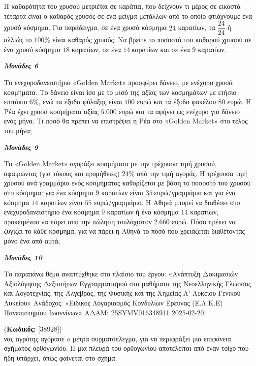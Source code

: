 \documentclass[11pt,a4paper,twoside]{book}
\newcounter{askhsh}[chapter]
\renewcommand{\theaskhsh}{
	\bf{\titlefont{\Large{\thechapter}}.\arabic{askhsh}}
}
\newcommand{\Askhsh}[2]{\refstepcounter{askhsh}{\titlefont{Άσκηση\theaskhsh} - \textcolor{maincolor}{ΘΕΜΑ #2}} (\small{\textbf{Κωδικός:} #1})\\}{}
\newcommand{\monades}[1]{
\hspace*{\fill}
\textbf{\textit{\textcolor{maincolor}{Μονάδες #1}}}}
\begin{document}
\begin{alist}
\item Η καθαρότητα του χρυσού μετριέται σε καράτια, που δείχνουν τι μέρος σε εικοστά τέταρτα είναι ο καθαρός χρυσός σε ένα μείγμα μετάλλων από το οποίο φτιάχνουμε ένα χρυσό κόσμημα. Για παράδειγμα, σε ένα χρυσό κόσμημα $24$ καρατίων, τα $\dfrac{24}{24}$ ή αλλιώς το $100\%$ είναι καθαρός χρυσός. Να βρείτε το ποσοστό του καθαρού χρυσού σε ένα χρυσό κόσμημα $18$ καρατίων, σε ένα $14\ $καρατίων και σε ένα $9$ καρατίων.
\monades{6}
\item Το ενεχυροδανειστήριο «Golden Market» προσφέρει δάνειο, με ενέχυρο χρυσά κοσμήματα. Το δάνειο είναι ίσο με το μισό της αξίας των κοσμημάτων με ετήσιο επιτόκιο $6\%$, ενώ τα έξοδα φύλαξης είναι $100$ ευρώ και τα έξοδα φακέλου $80$ ευρώ. Η Ρέα έχει χρυσά κοσμήματα αξίας $5.000$ ευρώ και τα αφήνει ως ενέχυρο για δάνειο ενός μήνα. Τι ποσό θα πρέπει να επιστρέψει η Ρέα στο «Golden Market» στο τέλος του μήνα;
\monades{9}
\item Το «Golden Market» αγοράζει κοσμήματα με την τρέχουσα τιμή χρυσού, αφαιρώντας (για τόκους και προμήθειες) $24\%$ από την τιμή αγοράς. Η τρέχουσα τιμή χρυσού ανά γραμμάριο ενός κοσμήματος καθορίζεται με βάση το ποσοστό του χρυσού στο κόσμημα: για ένα κόσμημα $9$ καρατίων είναι $35\ $ευρώ/γραμμάριο και για ένα κόσμημα $14$ καρατίων είναι $55$ ευρώ/γραμμάριο. Η Αθηνά μπορεί να διαθέσει στο ενεχυροδανειστήριο ένα κόσμημα $9$ καρατίων ή ένα κόσμημα $14$ καρατίων, προκειμένου να πάρει από την πώληση τουλάχιστον $2.660$ ευρώ. Πόσο πρέπει να ζυγίζει το κάθε κόσμημα, για να πάρει η Αθηνά το ποσό που χρειάζεται διαθέτοντας μόνο ένα από αυτά;
\monades{10}

{\footnotesize Το παραπάνω θέμα αναπτύχθηκε στο πλαίσιο του έργου: «Ανάπτυξη Δοκιμασιών Αξιολόγησης Δεξιοτήτων Εγγραμματισμού στα μαθήματα της Νεοελληνικής Γλώσσας και Λογοτεχνίας, της Άλγεβρας, της Φυσικής και της Χημείας Α' Λυκείου Γενικού Λυκείου» Ανάδοχος: «Ειδικός Λογαριασμός Κονδυλίων Έρευνας (Ε.Λ.Κ.Ε) Πανεπιστημίου Ιωαννίνων» ΑΔΑΜ: 25SYMV016348911 2025-02-20.}
\end{alist}

\vspace{4mm}

\Askhsh{[38928]}
Ένας αγρότης αγόρασε $a$ μέτρα συρματόπλεγμα, για να περιφράξει μια επιφάνεια σχήματος ορθογωνίου. Η μία πλευρά του ορθογωνίου αποτελείται από έναν τοίχο που ήδη υπάρχει, όπως φαίνεται στο σχήμα.

\end{document}
